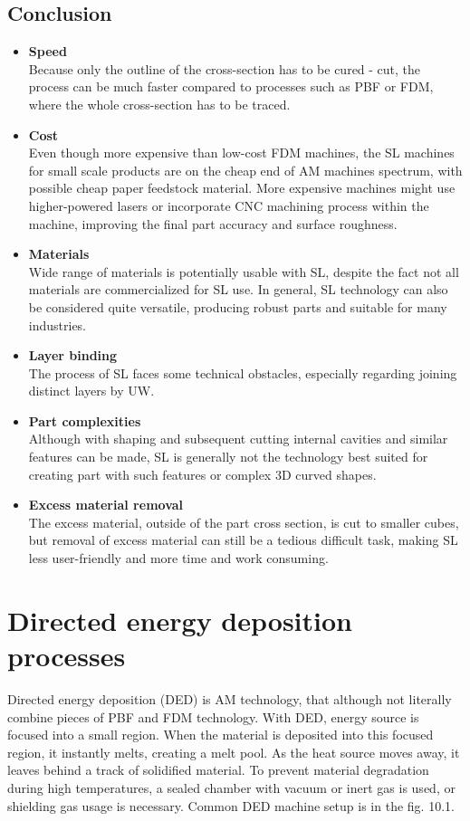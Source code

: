 \documentclass[a4paper, 11pt, reqno]{report}
\newcommand\pro{\item[$+$]}
\newcommand\con{\item[$-$]}
\begin{document}
\section{Conclusion}
\begin{itemize}
\pro \textbf{Speed}\\
Because only the outline of the cross-section has to be cured - cut, the process can be much faster compared to processes such as PBF or FDM, where the whole cross-section has to be traced.

\pro \textbf{Cost}\\
Even though more expensive than low-cost FDM machines, the SL machines for small scale products are on the cheap end of AM machines spectrum, with possible cheap paper feedstock material. More expensive machines might use higher-powered lasers or incorporate CNC machining process within the machine, improving the final part accuracy and surface roughness.

\pro \textbf{Materials}\\
Wide range of materials is potentially usable with SL, despite the fact not all materials are commercialized for SL use. In general, SL technology can also be considered quite versatile, producing robust parts and suitable for many industries.
\\[10pt]

\clearpage
\con \textbf{Layer binding}\\
The process of SL faces some technical obstacles, especially regarding joining distinct layers by UW.

\con \textbf{Part complexities}\\
Although with shaping and subsequent cutting internal cavities and similar features can be made, SL is generally not the technology best suited for creating part with such features or complex 3D curved shapes.

\con \textbf{Excess material removal}\\
The excess material, outside of the part cross section, is cut to smaller cubes, but removal of excess material can still be a tedious difficult task, making SL less user-friendly and more time and work consuming.
\end{itemize}

\chapter{Directed energy deposition processes}

Directed energy deposition (DED) is AM technology, that although not literally combine pieces of PBF and FDM technology. With DED, energy source is focused into a small region. When the material is deposited into this focused region, it instantly melts, creating a melt pool. As the heat source moves away, it leaves behind a track of solidified material. To prevent material degradation during high temperatures, a sealed chamber with vacuum or inert gas is used, or shielding gas usage is necessary. Common DED machine setup is in the fig. 10.1.
\end{document}
